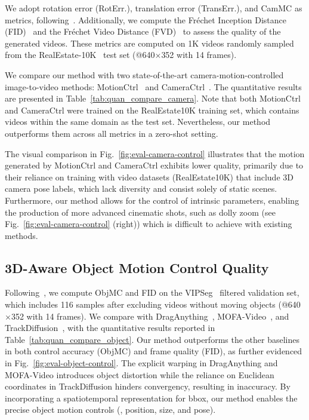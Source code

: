 We adopt rotation error (RotErr.), translation error (TransErr.), and CamMC as metrics, following~\cite{he2024cameractrl,wang2024motionctrl}. Additionally, we compute the Fréchet Inception Distance (FID)~\cite{heusel2017gans} and the Fréchet Video Distance (FVD)~\cite{unterthiner2019fvd} to assess the quality of the generated videos. These metrics are computed on 1K videos randomly sampled from the RealEstate-10K~\cite{zhou2018stereo} test set (@640$\times$352 with 14 frames).

We compare our method with two state-of-the-art camera-motion-controlled image-to-video methods: MotionCtrl~\cite{wang2024motionctrl} and CameraCtrl~\cite{he2024cameractrl}. The quantitative results are presented in Table~\ref{tab:quan_compare_camera}. Note that both MotionCtrl and CameraCtrl were trained on the RealEstate10K training set, which contains videos within the same domain as the test set. Nevertheless, our method outperforms them across all metrics in a zero-shot setting. 

The visual comparison in Fig.~\ref{fig:eval-camera-control} illustrates that the motion generated by MotionCtrl and CameraCtrl exhibits lower quality, primarily due to their reliance on training with video datasets (RealEstate10K) that include 3D camera pose labels, which lack diversity and consist solely of static scenes. Furthermore, our method allows for the control of intrinsic parameters, enabling the production of more advanced cinematic shots, such as dolly zoom (see Fig.~\ref{fig:eval-camera-control} (right)) which is difficult to achieve with existing methods.



\subsection{3D-Aware Object Motion Control Quality}

Following~\cite{wu2025draganything}, we compute ObjMC and FID on the VIPSeg~\cite{miao2022large} filtered validation set, which includes 116 samples after excluding videos without moving objects (@640$\times$352 with 14 frames). We compare with DragAnything~\cite{wu2025draganything}, MOFA-Video~\cite{niu2025mofa}, and TrackDiffusion~\cite{li2023trackdiffusion}, with the quantitative results reported in Table~\ref{tab:quan_compare_object}. 
Our method outperforms the other baselines in both control accuracy (ObjMC) and frame quality (FID), as further evidenced in Fig.~\ref{fig:eval-object-control}. The explicit warping in DragAnything and MOFA-Video introduces object distortion while the reliance on Euclidean coordinates in TrackDiffusion hinders convergency, resulting in inaccuracy. By incorporating a spatiotemporal representation for bbox, our method enables the precise object motion controls (\eg, position, size, and pose).


